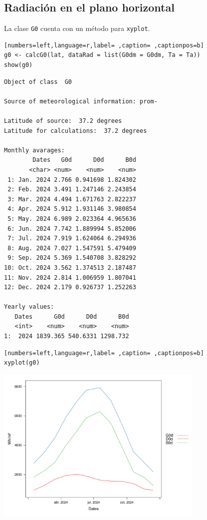 \subsection{Radiación en el plano horizontal}
\label{sec:org3d159aa}
La clase \texttt{G0} cuenta con un método para \texttt{xyplot}.
\begin{lstlisting}[numbers=left,language=r,label= ,caption= ,captionpos=b]
g0 <- calcG0(lat, dataRad = list(G0dm = G0dm, Ta = Ta))
show(g0)
\end{lstlisting}

\begin{verbatim}
Object of class  G0 

Source of meteorological information: prom- 

Latitude of source:  37.2 degrees
Latitude for calculations:  37.2 degrees

Monthly avarages:
        Dates   G0d      D0d      B0d
       <char> <num>    <num>    <num>
 1: Jan. 2024 2.766 0.941698 1.824302
 2: Feb. 2024 3.491 1.247146 2.243854
 3: Mar. 2024 4.494 1.671763 2.822237
 4: Apr. 2024 5.912 1.931146 3.980854
 5: May. 2024 6.989 2.023364 4.965636
 6: Jun. 2024 7.742 1.889994 5.852006
 7: Jul. 2024 7.919 1.624064 6.294936
 8: Aug. 2024 7.027 1.547591 5.479409
 9: Sep. 2024 5.369 1.540708 3.828292
10: Oct. 2024 3.562 1.374513 2.187487
11: Nov. 2024 2.814 1.006959 1.807041
12: Dec. 2024 2.179 0.926737 1.252263

Yearly values:
   Dates      G0d      D0d      B0d
   <int>    <num>    <num>    <num>
1:  2024 1839.365 540.6331 1298.732
\end{verbatim}

\begin{lstlisting}[numbers=left,language=r,label= ,caption= ,captionpos=b]
xyplot(g0)
\end{lstlisting}
\begin{center}
\includegraphics[keepaspectratio,width=0.75\textwidth,height=0.5\textheight]{figuras/codigo-g0.pdf}
\end{center}

